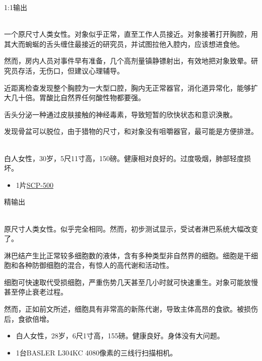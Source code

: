 1:1输出

\\
一个原尺寸人类女性。对象似乎正常，直至工作人员接近。对象接著打开胸腔，用其大而蜿蜒的舌头缠住最接近的研究员，并试图拉他入腔内，应该想进食他。

然而，房内人员对事件早有准备，几个高剂量镇静镖射出，有效地把对象致晕。研究员存活，无伤口，但建议心理辅导。

近距离检查发现整个胸腔为一大型口腔，胸内无正常器官，消化道异常化，能够扩大几十倍。胃酸比自然界任何酸性物都要强。

舌头分泌一种通过皮肤接触的神经毒素，导致短暂的欣快状态和意识涣散。

发现骨盆可以脱位，由于猎物的尺寸，和对象没有咀嚼器官，最可能是方便排泄。



\\
白人女性，30岁，5尺11寸高，150磅。健康相对良好的。过度吸烟，肺部轻度损坏。

\begin{itemize}
\item 1片\hyperref[chap:SCP-500]{SCP-500}
\end{itemize}

精输出

\\
原尺寸人类女性。似乎完全相同。然而，初步测试显示，受试者淋巴系统大幅改变了。

淋巴结产生比正常较多细胞数的液体，含有多种类型非自然界的细胞。细胞是干细胞和各种防御细胞的混合，有惊人的高代谢和活动性。

细胞可快速取代受损细胞，严重伤势几天甚至几小时就可快速重生。对象可能放慢甚至停止衰老过程。

然而，正如前文所述，细胞具有非常高的新陈代谢，导致主体高昂的食欲。被损伤后，食欲倍增。





\begin{itemize}
\item 白人女性，28岁，6尺1寸高，155磅。健康良好。身体没有大问题。
\item 1台BASLER L304KC 4080像素的三线行扫描相机。
\end{itemize}


